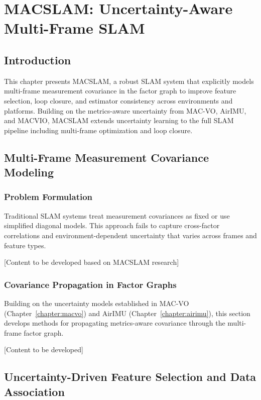 \chapter{MACSLAM: Uncertainty-Aware Multi-Frame SLAM} \label{chapter:macslam}

\section{Introduction}

This chapter presents MACSLAM, a robust SLAM system that explicitly models multi-frame measurement covariance in the factor graph to improve feature selection, loop closure, and estimator consistency across environments and platforms. Building on the metrics-aware uncertainty from MAC-VO, AirIMU, and MACVIO, MACSLAM extends uncertainty learning to the full SLAM pipeline including multi-frame optimization and loop closure.

\section{Multi-Frame Measurement Covariance Modeling}

\subsection{Problem Formulation}

Traditional SLAM systems treat measurement covariances as fixed or use simplified diagonal models. This approach fails to capture cross-factor correlations and environment-dependent uncertainty that varies across frames and feature types.

[Content to be developed based on MACSLAM research]

\subsection{Covariance Propagation in Factor Graphs}

Building on the uncertainty models established in MAC-VO (Chapter~\ref{chapter:macvo}) and AirIMU (Chapter~\ref{chapter:airimu}), this section develops methods for propagating metrics-aware covariance through the multi-frame factor graph.

[Content to be developed]

\section{Uncertainty-Driven Feature Selection and Data Association}

